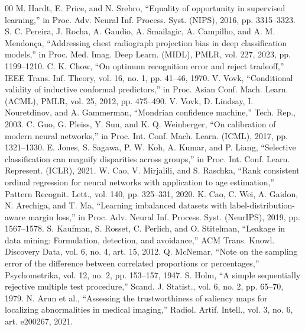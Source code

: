 \documentclass[conference,a4paper]{IEEEtran}
\begin{document}
\begin{thebibliography}{00}
 M. Hardt, E. Price, and N. Srebro, ``Equality of opportunity in supervised learning,'' in Proc. Adv. Neural Inf. Process. Syst. (NIPS), 2016, pp. 3315--3323.
 S. C. Pereira, J. Rocha, A. Gaudio, A. Smailagic, A. Campilho, and A. M. Mendon\c{c}a, ``Addressing chest radiograph projection bias in deep classification models,'' in Proc. Med. Imag. Deep Learn. (MIDL), PMLR, vol. 227, 2023, pp. 1199--1210.
 C. K. Chow, ``On optimum recognition error and reject tradeoff,'' IEEE Trans. Inf. Theory, vol. 16, no. 1, pp. 41--46, 1970.
 V. Vovk, ``Conditional validity of inductive conformal predictors,'' in Proc. Asian Conf. Mach. Learn. (ACML), PMLR, vol. 25, 2012, pp. 475--490.
 V. Vovk, D. Lindsay, I. Nouretdinov, and A. Gammerman, ``Mondrian confidence machine,'' Tech. Rep., 2003.
 C. Guo, G. Pleiss, Y. Sun, and K. Q. Weinberger, ``On calibration of modern neural networks,'' in Proc. Int. Conf. Mach. Learn. (ICML), 2017, pp. 1321--1330.
 E. Jones, S. Sagawa, P. W. Koh, A. Kumar, and P. Liang, ``Selective classification can magnify disparities across groups,'' in Proc. Int. Conf. Learn. Represent. (ICLR), 2021.
 W. Cao, V. Mirjalili, and S. Raschka, ``Rank consistent ordinal regression for neural networks with application to age estimation,'' Pattern Recognit. Lett., vol. 140, pp. 325--331, 2020.
 K. Cao, C. Wei, A. Gaidon, N. Arechiga, and T. Ma, ``Learning imbalanced datasets with label-distribution-aware margin loss,'' in Proc. Adv. Neural Inf. Process. Syst. (NeurIPS), 2019, pp. 1567--1578.
 S. Kaufman, S. Rosset, C. Perlich, and O. Stitelman, ``Leakage in data mining: Formulation, detection, and avoidance,'' ACM Trans. Knowl. Discovery Data, vol. 6, no. 4, art. 15, 2012.
 Q. McNemar, ``Note on the sampling error of the difference between correlated proportions or percentages,'' Psychometrika, vol. 12, no. 2, pp. 153--157, 1947.
 S. Holm, ``A simple sequentially rejective multiple test procedure,'' Scand. J. Statist., vol. 6, no. 2, pp. 65--70, 1979.
 N. Arun et al., ``Assessing the trustworthiness of saliency maps for localizing abnormalities in medical imaging,'' Radiol. Artif. Intell., vol. 3, no. 6, art. e200267, 2021.
\end{thebibliography}
\end{document}
